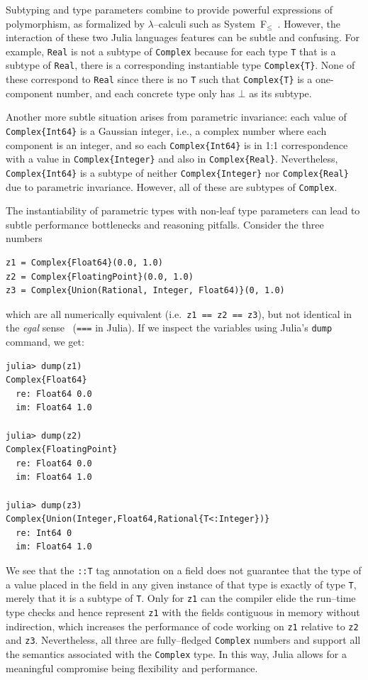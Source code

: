 \documentclass[pldi]{sigplanconf-pldi15}
\begin{document}
Subtyping and type parameters combine to provide powerful expressions of
polymorphism, as formalized by $\lambda$--calculi such as
System~F$_\le$~\cite{Cardelli1985}. However, the interaction of these two
Julia languages features can be subtle and confusing. For example, \verb|Real|
is not a subtype of \verb|Complex| because for each type \verb|T| that is a
subtype of \verb|Real|, there is a corresponding instantiable type
\verb|Complex{T}|. None of these correspond to \verb|Real| since there is no
\verb|T| such that \verb|Complex{T}| is a one-component number, and each
concrete type only has $\bot$ as its subtype.

Another more subtle situation arises from parametric invariance: each value of
\verb|Complex{Int64}| is a Gaussian integer, i.e., a complex number where each
component is an integer, and so each \verb|Complex{Int64}| is in 1:1
correspondence with a value in \verb|Complex{Integer}| and also in
\verb|Complex{Real}|. Nevertheless, \verb|Complex{Int64}| is a subtype of
neither \verb|Complex{Integer}| nor \verb|Complex{Real}| due to parametric
invariance. However, all of these are subtypes of \verb|Complex|.

The instantiability of parametric types with non-leaf type parameters can lead
to subtle performance bottlenecks and reasoning pitfalls. Consider the three
 numbers

\begin{lstlisting}
z1 = Complex{Float64}(0.0, 1.0)
z2 = Complex{FloatingPoint}(0.0, 1.0)
z3 = Complex{Union(Rational, Integer, Float64)}(0, 1.0)
\end{lstlisting}
%
which are all numerically equivalent (i.e.\ \verb|z1 == z2 == z3|), but not
identical in the \textit{egal} sense~\cite{Baker1993} (\verb|===| in Julia).
If we inspect the variables using Julia's \verb|dump| command, we get:

\begin{lstlisting}
julia> dump(z1)
Complex{Float64}
  re: Float64 0.0
  im: Float64 1.0

julia> dump(z2)
Complex{FloatingPoint}
  re: Float64 0.0
  im: Float64 1.0

julia> dump(z3)
Complex{Union(Integer,Float64,Rational{T<:Integer})}
  re: Int64 0
  im: Float64 1.0
\end{lstlisting}
%
We see that the \verb|::T| tag annotation on a field does not guarantee that
the type of a value placed in the field in any given instance of that type is
exactly of type \verb|T|, merely that it is a subtype of \verb|T|. Only for
\verb|z1| can the compiler elide the run--time type checks and hence represent
\verb|z1| with the fields contiguous in memory without indirection, which
increases the performance of code working on \verb|z1| relative to \verb|z2|
and \verb|z3|. Nevertheless, all three are fully--fledged \verb|Complex|
numbers and support all the semantics associated with the \verb|Complex| type.
In this way, Julia allows for a meaningful compromise being flexibility and
performance.
\end{document}
